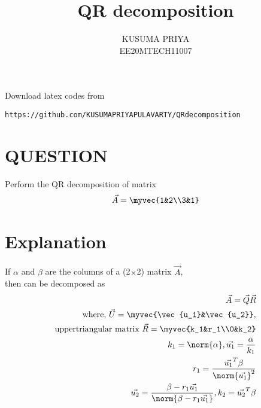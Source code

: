 \documentclass[journal,12pt,twocolumn]{IEEEtran}
\begin{document}
\renewcommand{\thefigure}{\theproblem}

\def\putbox#1#2#3{\makebox[0in][l]{\makebox[#1][l]{}\raisebox{\baselineskip}[0in][0in]{\raisebox{#2}[0in][0in]{#3}}}}
     \def\rightbox#1{\makebox[0in][r]{#1}}
     \def\centbox#1{\makebox[0in]{#1}}
     \def\topbox#1{\raisebox{-\baselineskip}[0in][0in]{#1}}
     \def\midbox#1{\raisebox{-0.5\baselineskip}[0in][0in]{#1}}
\vspace{3cm}
\title{QR decomposition}
\author{KUSUMA PRIYA\\EE20MTECH11007}

\maketitle
\newpage

\bigskip
\renewcommand{\thefigure}{\theenumi}
\renewcommand{\thetable}{\theenumi}
Download latex codes from 

\begin{lstlisting}
https://github.com/KUSUMAPRIYAPULAVARTY/QRdecomposition
\end{lstlisting}
%
 
 \section{QUESTION}
Perform the QR decomposition of matrix 
\begin{align}
 \vec{A}=\myvec{1&2\\3&1}
\end{align}

%
\section {Explanation}
If $\alpha$ and $\beta$ are the columns of a (2$\times$2) matrix $\vec{A}$,\\
then  can be decomposed as 
\begin{align}
  \vec{A}=\vec{Q}\vec{R}\label{1}\\
  \text{where, } \vec{U}=\myvec{\vec{u_1}&\vec{u_2}},\\
  \text{uppertriangular matrix }\vec{R}=\myvec{k_1&r_1\\0&k_2}\\
  k_1=\norm{\alpha},\vec{u_1}=\frac{\alpha}{k_1}\label{2}\\
 r_1=\frac{\vec{u_1}^T\beta}{\norm{\vec{u_1}}^2}\label{3} \\
 \vec{u_2}=\frac{\beta-r_1\vec{u_1}}{\norm{\beta-r_1\vec{u_1}}},k_2=\vec{u_2}^T\beta\label{4}
\end{align}
\end{document}
